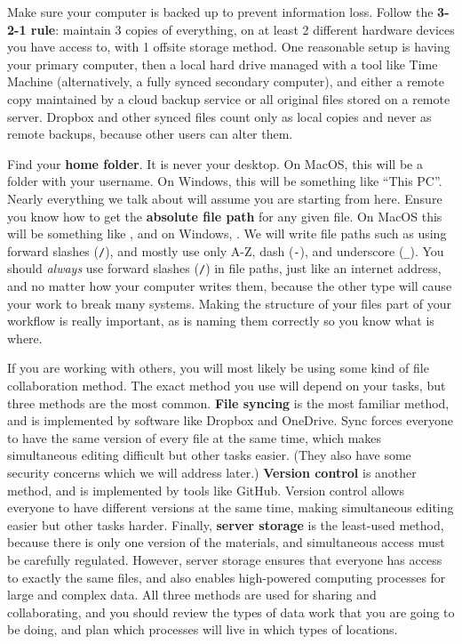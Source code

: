 Make sure your computer is backed up to prevent information loss.
Follow the \textbf{3-2-1 rule}: maintain 3 copies of everything,
on at least 2 different hardware devices you have access to,
with 1 offsite storage method.
One reasonable setup is having your primary computer,
then a local hard drive managed with a tool like Time Machine
(alternatively, a fully synced secondary computer),
and either a remote copy maintained by a cloud backup service
or all original files stored on a remote server.
Dropbox and other synced files count only as local copies and never as remote backups,
because other users can alter them.

Find your \textbf{home folder}. It is never your desktop.
On MacOS, this will be a folder with your username.
On Windows, this will be something like ``This PC''.
Nearly everything we talk about will assume you are starting from here.
Ensure you know how to get the \textbf{absolute file path} for any given file.
On MacOS this will be something like ,
and on Windows, .
We will write file paths such as 
using forward slashes (\texttt{/}), and mostly use only A-Z, dash (\texttt{-}), and underscore (\texttt{\_}).
You should \textit{always} use forward slashes (\texttt{/}) in file paths,
just like an internet address, and no matter how your computer writes them,
because the other type will cause your work to break many systems.
Making the structure of your files part of your workflow is really important,
as is naming them correctly so you know what is where.

If you are working with others, you will most likely be using some kind
of file collaboration method.
The exact method you use will depend on your tasks,
but three methods are the most common.
\textbf{File syncing} is the most familiar method,
and is implemented by software like Dropbox and OneDrive.
Sync forces everyone to have the same version of every file at the same time,
which makes simultaneous editing difficult but other tasks easier.
(They also have some security concerns which we will address later.)
\textbf{Version control} is another method,
and is implemented by tools like GitHub.
Version control allows everyone to have different versions at the same time,
making simultaneous editing easier but other tasks harder.
Finally, \textbf{server storage} is the least-used method,
because there is only one version of the materials,
and simultaneous access must be carefully regulated.
However, server storage ensures that everyone has access
to exactly the same files, and also enables
high-powered computing processes for large and complex data.
All three methods are used for sharing and collaborating,
and you should review the types of data work
that you are going to be doing, and plan which processes
will live in which types of locations.

